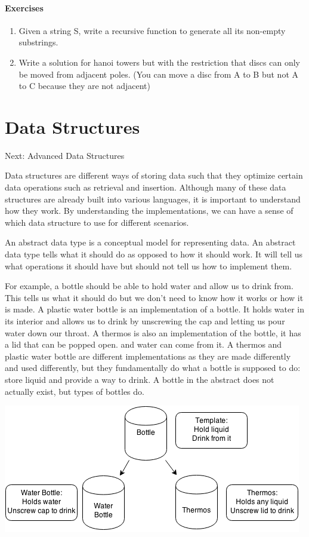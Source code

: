 \documentclass[11pt,oneside]{book}
\makeatletter
\def\maxwidth#1{\ifdim\Gin@nat@width>#1 #1\else\Gin@nat@width\fi}
\makeatother
\begin{document}
\subsection{Exercises}

\begin{enumerate}
\item Given a string S, write a recursive function to generate all its non-empty substrings.
\item Write a solution for hanoi towers but with the restriction that discs can only be moved from adjacent poles. (You can move a disc from A to B but not A to C because they are not adjacent)
\end{enumerate}

\part{ Data Structures }
    

Next: Advanced Data Structures

Data structures are different ways of storing data such that they optimize certain data operations such as retrieval and insertion. Although many of these data structures are already built into various languages, it is important to understand how they work. By understanding the implementations, we can have a sense of which data structure to use for different scenarios.

An abstract data type is a conceptual model for representing data. An abstract data type tells what it should do as opposed to how it should work. It will tell us what operations it should have but should not tell us how to implement them.

For example, a bottle should be able to hold water and allow us to drink from. This tells us what it should do but we don't need to know how it works or how it is made. A plastic water bottle is an implementation of a bottle. It holds water in its interior and allows us to drink by unscrewing the cap and letting us pour water down our throat. A thermos is also an implementation of the bottle, it has a lid that can be popped open. and water can come from it. A thermos and plastic water bottle are different implementations as they are made differently and used differently, but they fundamentally do what a bottle is supposed to do: store liquid and provide a way to drink. A bottle in the abstract does not actually exist, but types of bottles do.

\vspace{5px}\includegraphics[width=\maxwidth{\textwidth}]{bottle.png}
\end{document}
